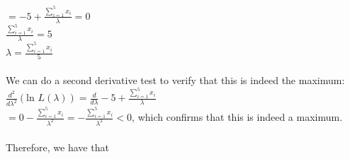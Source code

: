 \documentclass{article}
\newcommand{\1}{\mathbf{1}}
\begin{document}
{$= -5 + \frac{\sum_{i=1}^{5} x_i}{\lambda} = 0$ \\
$\frac{\sum_{i=1}^{5} x_i}{\lambda} = 5$ \\
$\lambda = \frac{\sum_{i=1}^{5} x_i}{5}$ \\ \\
We can do a second derivative test to verify that this is indeed the maximum: \\ 
$\frac{d^2}{d\lambda^2} (\text{ln } L(\lambda)) = \frac{d}{d\lambda} -5 + \frac{\sum_{i=1}^{5} x_i}{\lambda}$ \\
$= 0 - \frac{\sum_{i=1}^{5} x_i}{\lambda^2} = - \frac{\sum_{i=1}^{5} x_i}{\lambda^2} < 0$, which confirms that this is indeed a maximum. \\ \\
Therefore, we have that 

}
\end{document}
